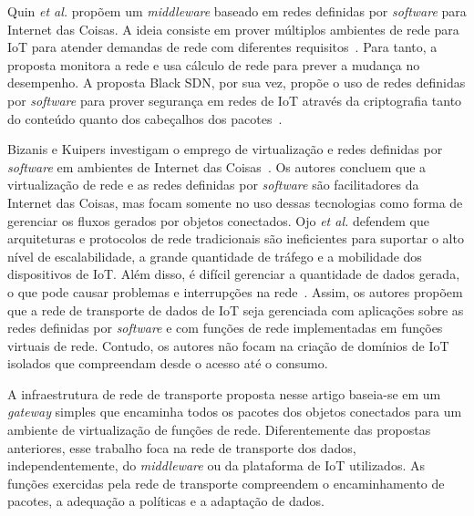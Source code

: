 \documentclass[12pt]{article}
\begin{document}
Quin \textit{et al.} propõem 
um {\it middleware} baseado em 
redes definidas por {\it software} para Internet das Coisas. A ideia consiste em prover múltiplos ambientes de rede para IoT para atender demandas de rede com diferentes requisitos~\cite{sdn-iot}. 
Para tanto, a proposta monitora a rede e usa cálculo de rede para prever a mudança no desempenho. A proposta Black SDN, por sua vez, propõe o uso de redes definidas por {\it software} para prover segurança em redes de IoT através da criptografia tanto do conteúdo quanto dos cabeçalhos dos pacotes~\cite{black-sdn}. %

Bizanis e Kuipers investigam o emprego de virtualização e redes definidas por {\it software} em ambientes de Internet das Coisas~\cite{sdn-nfv-iot}. Os autores concluem que a virtualização de rede e as redes definidas por {\it software} são facilitadores da Internet das Coisas, mas focam somente no uso dessas tecnologias como forma de gerenciar os fluxos gerados por objetos conectados. 
Ojo {\it et al.} defendem que arquiteturas e protocolos de rede tradicionais são ineficientes para suportar o alto nível de escalabilidade, a grande quantidade de tráfego e a mobilidade dos dispositivos de IoT. Além disso, é difícil gerenciar a quantidade de dados gerada, o que pode causar problemas e interrupções na rede~\cite{globecomm-nfv-iot}. Assim, os autores propõem que a rede de transporte de dados de IoT seja gerenciada com aplicações sobre as redes definidas por {\it software} e com funções de rede implementadas em funções virtuais de rede. Contudo, os autores não focam na criação de domínios de IoT isolados que compreendam desde o acesso até o consumo.


A infraestrutura de rede de transporte proposta nesse artigo baseia-se em um {\it gateway} simples que encaminha todos os pacotes dos objetos conectados para um ambiente de virtualização de funções de rede. Diferentemente das propostas anteriores, esse trabalho foca na rede de transporte dos dados, independentemente, do {\it middleware} ou da plataforma de IoT utilizados. As funções exercidas pela rede de transporte compreendem o encaminhamento de pacotes, a adequação a políticas e a adaptação de dados.%
\end{document}
